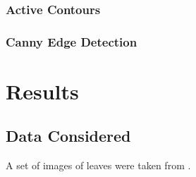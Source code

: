 \documentclass[12pt,english]{article}
\begin{document}
\subsubsection{Active Contours}

\subsubsection{Canny Edge Detection}

\pagebreak
\section{Results}
\subsection{Data Considered}
A set of images of leaves were taken from \cite[Fig. 111-8]{benson:1957}.
\end{document}
